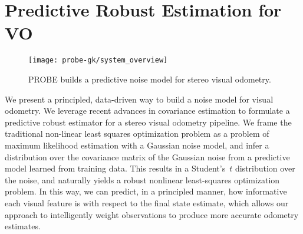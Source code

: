 \section{Predictive Robust Estimation for VO}

\begin{figure}
    \centering
      \texttt{[image: probe-gk/system\_overview]}
      \caption{PROBE builds a predictive noise model for stereo visual odometry.}
    \label{fig:probe_gk_system}
\end{figure}


We present a principled, data-driven way to build a noise model
for visual odometry. We leverage recent advances in covariance estimation
\citep{VegaBrown:2013fv} to formulate a predictive robust estimator for a
stereo visual odometry pipeline. We frame the traditional non-linear least
squares optimization problem as a problem of maximum likelihood estimation with
a Gaussian noise model, and infer a distribution over the covariance matrix of
the Gaussian noise from a predictive model learned from training data. This
results in a Student's~$t$ distribution over the noise, and naturally yields a
robust nonlinear least-squares optimization problem.  In this way, we can predict,
in a principled manner, how informative each visual feature is with respect to the final state
estimate, which allows our approach to intelligently weight observations to
produce more accurate odometry estimates.  
